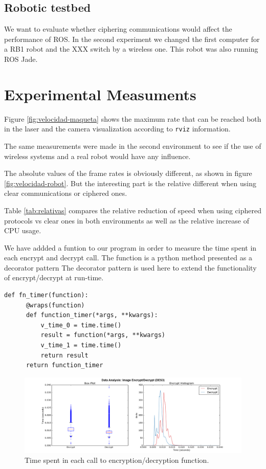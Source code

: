 \documentclass[journal,twoside]{JoPhA}
\begin{document}
\subsection{Robotic testbed}

We want to evaluate whether ciphering communications would affect the performance of ROS. 
In the second experiment we changed the first computer for a RB1 robot and the XXX switch by a wireless one. This robot was also running ROS Jade.



\section{Experimental Measuments}

Figure \ref{fig:velocidad-maqueta} shows the maximum rate that can be reached both in the laser and the camera visualization according to \texttt{rviz} information.

The same measurements were made in the second environment to see if the use of wireless systems and a real robot would have any influence.

The absolute values of the frame rates is obviously different, as shown in figure \ref{fig:velocidad-robot}. But the interesting part is the relative different when using clear communications or ciphered ones. 

Table \ref{tab:relativas}  compares the relative reduction of speed when using ciphered protocols vs clear ones in both environments as well as the relative increase of CPU usage.

We have addded a funtion to our program in order to measure the time spent in each encrypt and decrypt call. The function is a python method presented as a decorator pattern 
The decorator pattern is used here to extend the functionality of encrypt/decrypt at run-time. 


{
  \footnotesize{
    \begin{Verbatim}[frame=single]
def fn_timer(function):
	  @wraps(function)
	  def function_timer(*args, **kwargs):
	      v_time_0 = time.time()
	      result = function(*args, **kwargs)
	      v_time_1 = time.time()
	      return result
	  return function_timer
    \end{Verbatim}
  }
}

\begin{figure}[ht]
    \centering
    \includegraphics[width=.9\textwidth]{Outline_images_encryption_decrytiontime2.png}
    \caption{Time spent in each call to encryption/decryption function.}
  \label{fig:Conceptualmodel}
\end{figure}
\end{document}
